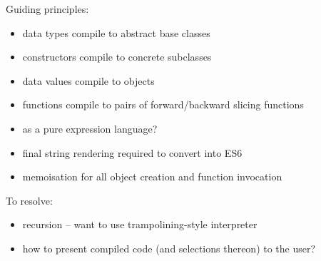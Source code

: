 
Guiding principles:
\begin{itemize}
   \item data types compile to abstract base classes
   \item constructors compile to concrete subclasses
   \item data values compile to objects
   \item functions compile to pairs of forward/backward slicing functions
   \item \JSCore as a pure expression language?
   \item final string rendering required to convert \JSCore into ES6
   \item memoisation for all object creation and function invocation
\end{itemize}

\noindent To resolve:
\begin{itemize}
   \item recursion -- want to use trampolining-style interpreter
   \item how to present compiled code (and selections thereon) to the user?
\end{itemize}





